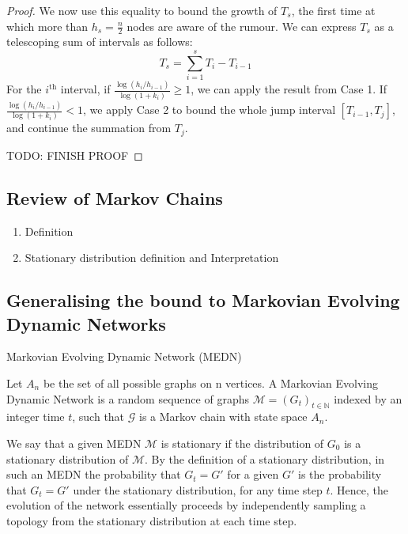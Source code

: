 \begin{proof}
	We now use this equality to bound the growth of $T_s$, the first time at which more than $h_s = \frac{n}{2}$ nodes are aware of the rumour. We can express $T_s$ as a telescoping sum of intervals as follows:
	$$
		T_s = \sum_{i=1}^s T_i - T_{i-1}
	$$
	For the $i^\text{th}$ interval, if $\frac{\log (h_i/h_{i-1})}{\log(1+k_i)} \geq 1$, we can apply the result from Case 1. If $\frac{\log (h_i/h_{i-1})}{\log(1+k_i)} < 1$, we apply Case 2 to bound the whole jump interval $[T_{i-1}, T_j]$, and continue the summation from $T_j$. %

	TODO: FINISH PROOF
	
\end{proof}

\subsection{Review of Markov Chains}

\begin{enumerate}
	\item Definition
	\item Stationary distribution definition and Interpretation
\end{enumerate}

\subsection{Generalising the bound to Markovian Evolving Dynamic Networks}
\label{subsection:MEDNBound}

\begin{definition}
	Markovian Evolving Dynamic Network (MEDN)

	\noindent 
	Let $A_n$ be the set of all possible graphs on n vertices.
	A Markovian Evolving Dynamic Network is a random sequence of graphs $\mathcal{M} = (G_t)_{t \in \mathbb{N}}$ indexed by an integer time $t$, such that $\mathcal{G}$ is a Markov chain with state space $A_n$.
\end{definition}

We say that a given MEDN $\mathcal{M}$ is stationary if the distribution of $G_0$ is a stationary distribution of $\mathcal{M}$. By the definition of a stationary distribution, in such an MEDN the probability that $G_t = G'$ for a given $G'$ is the probability that $G_t = G'$ under the stationary distribution, for any time step $t$. Hence, the evolution of the network essentially proceeds by independently sampling a topology from the stationary distribution at each time step. %

